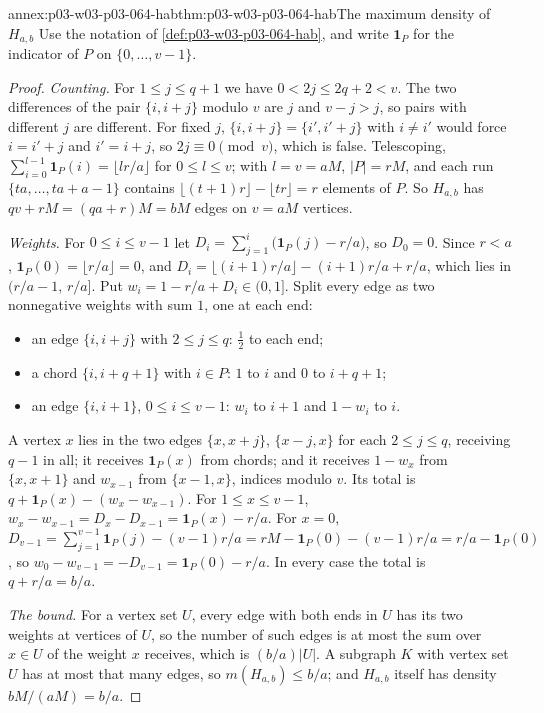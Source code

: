 \begin{annexitem}{annex:p03-w03-p03-064-hab}{thm:p03-w03-p03-064-hab}{The maximum density of \(H_{a,b}\)}
Use the notation of \cref{def:p03-w03-p03-064-hab}, and write \(\mathbf
1_P\) for the indicator of \(P\) on \(\{0,\ldots,v-1\}\).
\begin{proof}
\emph{Counting.}  For \(1\leq j\leq q+1\) we have \(0<2j\leq2q+2<v\).  The
two differences of the pair \(\{i,i+j\}\) modulo \(v\) are \(j\) and
\(v-j>j\), so pairs with different \(j\) are different.  For fixed \(j\),
\(\{i,i+j\}=\{i',i'+j\}\) with \(i\neq i'\) would force \(i=i'+j\) and
\(i'=i+j\), so \(2j\equiv0\pmod v\), which is false.  Telescoping,
\(\sum_{i=0}^{l-1}\mathbf 1_P(i)=\lfloor lr/a\rfloor\) for
\(0\leq l\leq v\); with \(l=v=aM\), \(|P|=rM\), and each run
\(\{ta,\ldots,ta+a-1\}\) contains \(\lfloor(t+1)r\rfloor-\lfloor tr\rfloor=r\)
elements of \(P\).  So \(H_{a,b}\) has \(qv+rM=(qa+r)M=bM\) edges on
\(v=aM\) vertices.

\emph{Weights.}  For \(0\leq i\leq v-1\) let
\(D_i=\sum_{j=1}^{i}\bigl(\mathbf 1_P(j)-r/a\bigr)\), so \(D_0=0\).  Since
\(r<a\), \(\mathbf 1_P(0)=\lfloor r/a\rfloor=0\), and
\(D_i=\lfloor(i+1)r/a\rfloor-(i+1)r/a+r/a\), which lies in
\((r/a-1,\,r/a]\).  Put \(w_i=1-r/a+D_i\in(0,1]\).  Split every edge as two
nonnegative weights with sum \(1\), one at each end:
\begin{itemize}
\item an edge \(\{i,i+j\}\) with \(2\leq j\leq q\): \(\frac12\) to each end;
\item a chord \(\{i,i+q+1\}\) with \(i\in P\): \(1\) to \(i\) and \(0\) to
  \(i+q+1\);
\item an edge \(\{i,i+1\}\), \(0\leq i\leq v-1\): \(w_i\) to \(i+1\) and
  \(1-w_i\) to \(i\).
\end{itemize}
A vertex \(x\) lies in the two edges \(\{x,x+j\}\), \(\{x-j,x\}\) for each
\(2\leq j\leq q\), receiving \(q-1\) in all; it receives \(\mathbf 1_P(x)\)
from chords; and it receives \(1-w_x\) from \(\{x,x+1\}\) and
\(w_{x-1}\) from \(\{x-1,x\}\), indices modulo \(v\).  Its total is
\(q+\mathbf 1_P(x)-(w_x-w_{x-1})\).  For \(1\leq x\leq v-1\),
\(w_x-w_{x-1}=D_x-D_{x-1}=\mathbf 1_P(x)-r/a\).  For \(x=0\),
\(D_{v-1}=\sum_{j=1}^{v-1}\mathbf 1_P(j)-(v-1)r/a
=rM-\mathbf 1_P(0)-(v-1)r/a=r/a-\mathbf 1_P(0)\), so
\(w_0-w_{v-1}=-D_{v-1}=\mathbf 1_P(0)-r/a\).  In every case the total is
\(q+r/a=b/a\).

\emph{The bound.}  For a vertex set \(U\), every edge with both ends in
\(U\) has its two weights at vertices of \(U\), so the number of such edges
is at most the sum over \(x\in U\) of the weight \(x\) receives, which is
\((b/a)|U|\).  A subgraph \(K\) with vertex set \(U\) has at most that many
edges, so \(m(H_{a,b})\leq b/a\); and \(H_{a,b}\) itself has density
\(bM/(aM)=b/a\).
\end{proof}
\end{annexitem}

